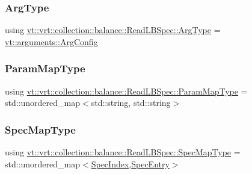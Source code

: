 \subsubsection{\texorpdfstring{Arg\+Type}{ArgType}}
{\footnotesize\ttfamily using \hyperlink{structvt_1_1vrt_1_1collection_1_1balance_1_1_read_l_b_spec_ae6a9d2b206e9d005310031e2aa42767c}{vt\+::vrt\+::collection\+::balance\+::\+Read\+L\+B\+Spec\+::\+Arg\+Type} =  \hyperlink{structvt_1_1arguments_1_1_arg_config}{vt\+::arguments\+::\+Arg\+Config}}

\mbox{\label{structvt_1_1vrt_1_1collection_1_1balance_1_1_read_l_b_spec_a01c2aa3a9e92be646c37f24afda6afa2}} 
\subsubsection{\texorpdfstring{Param\+Map\+Type}{ParamMapType}}
{\footnotesize\ttfamily using \hyperlink{structvt_1_1vrt_1_1collection_1_1balance_1_1_read_l_b_spec_a01c2aa3a9e92be646c37f24afda6afa2}{vt\+::vrt\+::collection\+::balance\+::\+Read\+L\+B\+Spec\+::\+Param\+Map\+Type} =  std\+::unordered\+\_\+map$<$std\+::string, std\+::string$>$}

\mbox{\label{structvt_1_1vrt_1_1collection_1_1balance_1_1_read_l_b_spec_a6b1c83bd61c581d9605941e2381432b9}} 
\subsubsection{\texorpdfstring{Spec\+Map\+Type}{SpecMapType}}
{\footnotesize\ttfamily using \hyperlink{structvt_1_1vrt_1_1collection_1_1balance_1_1_read_l_b_spec_a6b1c83bd61c581d9605941e2381432b9}{vt\+::vrt\+::collection\+::balance\+::\+Read\+L\+B\+Spec\+::\+Spec\+Map\+Type} =  std\+::unordered\+\_\+map$<$\hyperlink{namespacevt_1_1vrt_1_1collection_1_1balance_a72a5e0d9936ddf57f8e6c64e0e9fd123}{Spec\+Index},\hyperlink{structvt_1_1vrt_1_1collection_1_1balance_1_1_spec_entry}{Spec\+Entry}$>$}



